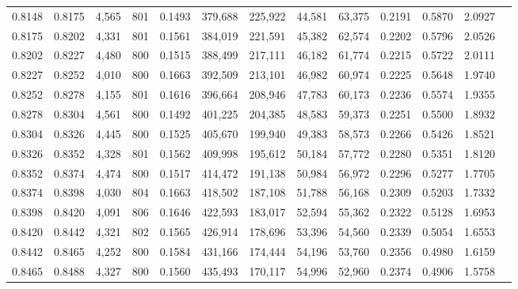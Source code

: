 \begin{tabular}{rrrrrrrrrrrrr}
0.8148 & 0.8175 &  4,565 & 801 &                                     0.1493 & 379,688 & 225,922 &  44,581 &  63,375 & 0.2191 & 0.5870 & 2.0927 \\
0.8175 & 0.8202 &  4,331 & 801 &                                     0.1561 & 384,019 & 221,591 &  45,382 &  62,574 & 0.2202 & 0.5796 & 2.0526 \\
0.8202 & 0.8227 &  4,480 & 800 &                                     0.1515 & 388,499 & 217,111 &  46,182 &  61,774 & 0.2215 & 0.5722 & 2.0111 \\
0.8227 & 0.8252 &  4,010 & 800 &                                     0.1663 & 392,509 & 213,101 &  46,982 &  60,974 & 0.2225 & 0.5648 & 1.9740 \\
0.8252 & 0.8278 &  4,155 & 801 &                                     0.1616 & 396,664 & 208,946 &  47,783 &  60,173 & 0.2236 & 0.5574 & 1.9355 \\
0.8278 & 0.8304 &  4,561 & 800 &                                     0.1492 & 401,225 & 204,385 &  48,583 &  59,373 & 0.2251 & 0.5500 & 1.8932 \\
0.8304 & 0.8326 &  4,445 & 800 &                                     0.1525 & 405,670 & 199,940 &  49,383 &  58,573 & 0.2266 & 0.5426 & 1.8521 \\
0.8326 & 0.8352 &  4,328 & 801 &                                     0.1562 & 409,998 & 195,612 &  50,184 &  57,772 & 0.2280 & 0.5351 & 1.8120 \\
0.8352 & 0.8374 &  4,474 & 800 &                                     0.1517 & 414,472 & 191,138 &  50,984 &  56,972 & 0.2296 & 0.5277 & 1.7705 \\
0.8374 & 0.8398 &  4,030 & 804 &                                     0.1663 & 418,502 & 187,108 &  51,788 &  56,168 & 0.2309 & 0.5203 & 1.7332 \\
0.8398 & 0.8420 &  4,091 & 806 &                                     0.1646 & 422,593 & 183,017 &  52,594 &  55,362 & 0.2322 & 0.5128 & 1.6953 \\
0.8420 & 0.8442 &  4,321 & 802 &                                     0.1565 & 426,914 & 178,696 &  53,396 &  54,560 & 0.2339 & 0.5054 & 1.6553 \\
0.8442 & 0.8465 &  4,252 & 800 &                                     0.1584 & 431,166 & 174,444 &  54,196 &  53,760 & 0.2356 & 0.4980 & 1.6159 \\
0.8465 & 0.8488 &  4,327 & 800 &                                     0.1560 & 435,493 & 170,117 &  54,996 &  52,960 & 0.2374 & 0.4906 & 1.5758 \\

\end{tabular}
